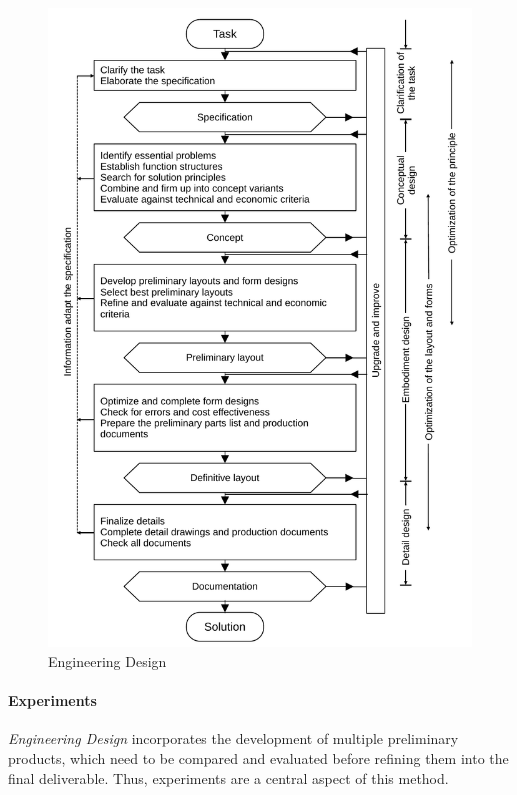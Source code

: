 \begin{figure}[htbp]
  \centering
  \includegraphics[width=\linewidth]{images/2_methodology/design_process}
  \caption[Engineering Design]{Engineering Design~\cite{Dym2012,Pahl1984}}
  \label{fig:engineering_design}
\end{figure}

\paragraph{Experiments} \emph{Engineering Design} incorporates the development of
multiple preliminary products, which need to be compared and evaluated before refining
them into the final deliverable. Thus, experiments are a central aspect of this method.

